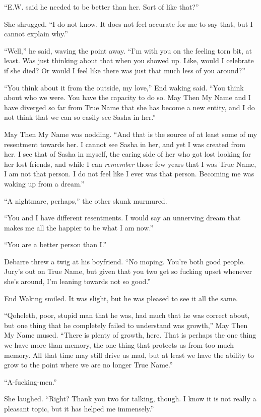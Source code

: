 ``E.W. said he needed to be better than her. Sort of like that?''

She shrugged. ``I do not know. It does not feel accurate for me to say that, but I cannot explain why.''

``Well,'' he said, waving the point away. ``I'm with you on the feeling torn bit, at least. Was just thinking about that when you showed up. Like, would I celebrate if she died? Or would I feel like there was just that much less of you around?''

``You think about it from the outside, my love,'' End waking said. ``You think about who we were. You have the capacity to do so. May Then My Name and I have diverged so far from True Name that she has become a new entity, and I do not think that we can so easily see Sasha in her.''

May Then My Name was nodding. ``And that is the source of at least some of my resentment towards her. I cannot see Sasha in her, and yet I was created from her. I see that of Sasha in myself, the caring side of her who got lost looking for her lost friends, and while I can \emph{remember} those few years that I was True Name, I am not that person. I do not feel like I ever was that person. Becoming me was waking up from a dream.''

``A nightmare, perhaps,'' the other skunk murmured.

``You and I have different resentments. I would say an unnerving dream that makes me all the happier to be what I am now.''

``You are a better person than I.''

Debarre threw a twig at his boyfriend. ``No moping. You're both good people. Jury's out on True Name, but given that you two get so fucking upset whenever she's around, I'm leaning towards not so good.''

End Waking smiled. It was slight, but he was pleased to see it all the same.

``Qoheleth, poor, stupid man that he was, had much that he was correct about, but one thing that he completely failed to understand was growth,'' May Then My Name mused. ``There is plenty of growth, here. That is perhaps the one thing we have more than memory, the one thing that protects us from too much memory. All that time may still drive us mad, but at least we have the ability to grow to the point where we are no longer True Name.''

``A-fucking-men.''

She laughed. ``Right? Thank you two for talking, though. I know it is not really a pleasant topic, but it has helped me immensely.''

